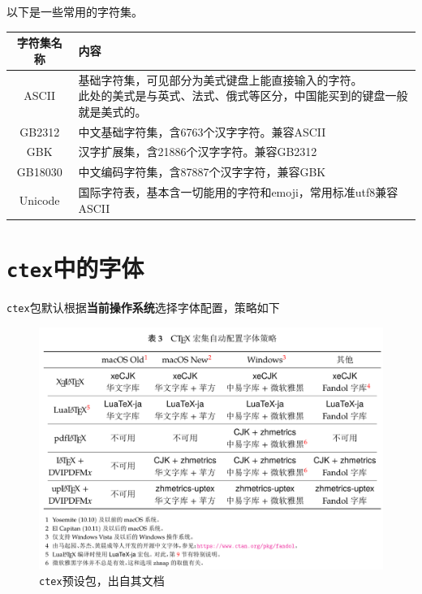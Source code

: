\documentclass[10pt,openany]{book}
\begin{document}
\begin{sloppypar}
    以下是一些常用的字符集。

    \begin{center}
        \begin{longtable}{cl}
            \textbf{字符集名称} & \textbf{内容}                            \\
            \hline
            \endfirsthead
            ASCII          & \makecell{基础字符集，可见部分为美式键盘上能直接输入的字符。    \\此处的美式是与英式、法式、俄式等区分，中国能买到的键盘一般就是美式的。}\\
            \hline
            GB2312         & 中文基础字符集，含6763个汉字字符。兼容ASCII             \\
            \hline
            GBK            & 汉字扩展集，含21886个汉字字符。兼容GB2312             \\
            \hline
            GB18030        & 中文编码字符集，含87887个汉字字符，兼容GBK              \\
            \hline
            Unicode        & 国际字符表，基本含一切能用的字符和emoji，常用标准utf8兼容ASCII \\
            \hline
        \end{longtable}
    \end{center}

    \section{\texttt{ctex}中的字体}

    \texttt{ctex}包默认根据\textbf{当前操作系统}选择字体配置，策略如下

    \begin{figure}[H]
        \centering
        \includegraphics[width=\linewidth]{data/ctex.png}
        \caption{\texttt{ctex}预设包，出自其文档}
    \end{figure}


\end{sloppypar}
\end{document}
